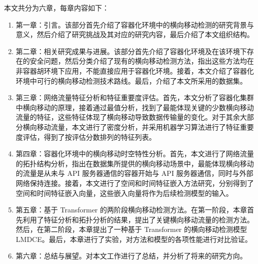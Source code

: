 {本文共分为六章，每章内容如下：

\begin{enumerate}
    \item 第一章：引言。该部分首先介绍了容器化环境中的横向移动检测的研究背景与意义，然后介绍了研究挑战及其对应的研究内容，最后介绍了本文组织结构。
    \item 第二章：相关研究成果与进展。该部分首先介绍了容器化环境及在该环境下存在的安全问题，然后分类介绍了现有的横向移动检测方法，指出这些方法均在非容器胡环境下应用，不能直接应用于容器化环境。接着，本文介绍了容器化环境中可行的横向移动检测技术路线。最后，介绍了本文所采用的数据集。
    \item 第三章：网络流量特征分析和特征重要度评估。首先，本文分析了容器化集群中横向移动的原理，接着通过最值分析，找到了最能体现关键的少数横向移动流量的特征，这些特征体现了横向移动导致数据传输量的变化。对于其余大部分横向移动流量，本文进行了密度分析，并采用机器学习算法进行了特征重要度评估，得到了按评估分数排列的特征列表。
    \item 第四章：容器化环境中的横向移动时空特性分析。首先，本文进行了网络流量的拓扑结构分析，指出在数据集所提供的横向移动场景中，最能体现横向移动的流量是从未与 API 服务器通信的容器开始与 API 服务器通信，同时与外部网络保持连接。接着，本文进行了空间和时间特征嵌入方法研究，分别得到了空间和时间特征嵌入向量，这些嵌入向量将作为后续检测模型的输入。
    \item 第五章：基于 Transformer 的两阶段横向移动检测方法。在第一阶段，本章首先利用了特征分析和拓扑分析的结果，提出了关键横向移动流量的检测方法。然后，在第二阶段，本章提出了一种基于 Transformer 的横向移动检测模型 LMDCE。最后，本章进行了实验，对方法和模型的各项性能进行对比验证。
    \item 第六章：总结与展望。对本文工作进行了总结，并分析了将来的研究方向。
\end{enumerate}
}